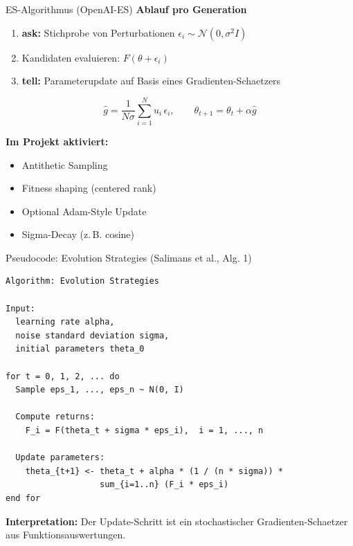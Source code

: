 \documentclass[aspectratio=169,11pt]{beamer}
\begin{document}
\begin{frame}{ES-Algorithmus (OpenAI-ES)}
\textbf{Ablauf pro Generation}
\begin{enumerate}
  \item \textbf{ask:} Stichprobe von Perturbationen $\epsilon_i \sim \mathcal{N}(0,\sigma^2 I)$
  \item Kandidaten evaluieren: $F(\theta + \epsilon_i)$
  \item \textbf{tell:} Parameterupdate auf Basis eines Gradienten-Schaetzers
\end{enumerate}

\vspace{0.4em}
\[
\hat{g} = \frac{1}{N\sigma}\sum_{i=1}^N u_i\,\epsilon_i,
\qquad
\theta_{t+1}=\theta_t + \alpha\hat{g}
\]

\textbf{Im Projekt aktiviert:}
\begin{itemize}
  \item Antithetic Sampling
  \item Fitness shaping (centered rank)
  \item Optional Adam-Style Update
  \item Sigma-Decay (z.\,B. cosine)
\end{itemize}
\end{frame}

\begin{frame}[fragile]{Pseudocode: Evolution Strategies (Salimans et al., Alg. 1)}
\small
\begin{lstlisting}[style=pycode]
Algorithm: Evolution Strategies

Input:
  learning rate alpha,
  noise standard deviation sigma,
  initial parameters theta_0

for t = 0, 1, 2, ... do
  Sample eps_1, ..., eps_n ~ N(0, I)

  Compute returns:
    F_i = F(theta_t + sigma * eps_i),  i = 1, ..., n

  Update parameters:
    theta_{t+1} <- theta_t + alpha * (1 / (n * sigma)) *
                   sum_{i=1..n} (F_i * eps_i)
end for
\end{lstlisting}

\textbf{Interpretation:} Der Update-Schritt ist ein stochastischer Gradienten-Schaetzer aus Funktionsauswertungen.
\end{frame}
\end{document}
